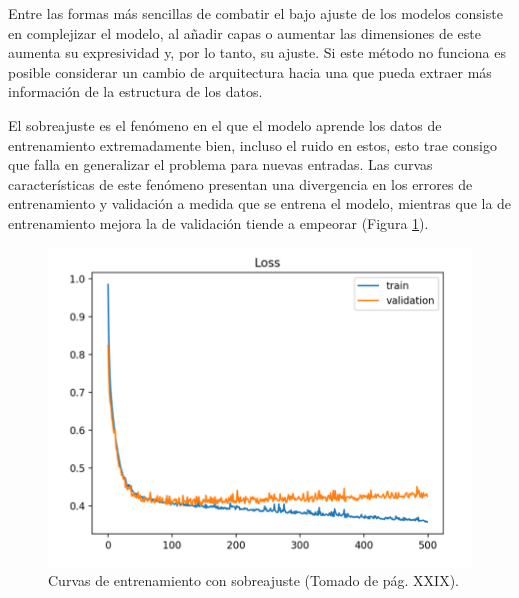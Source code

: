 Entre las formas más sencillas de combatir el bajo ajuste de los modelos consiste en complejizar el modelo, al añadir
capas o aumentar las dimensiones de este aumenta su expresividad y, por lo tanto, su ajuste. Si este método 
no funciona es posible considerar un cambio de arquitectura hacia una que pueda extraer más información de la 
estructura de los datos. 

El sobreajuste es el fenómeno en el que el modelo aprende los datos de entrenamiento extremadamente bien, incluso
el ruido en estos, esto trae consigo que falla en generalizar el problema para nuevas entradas. Las curvas 
características de este fenómeno presentan una divergencia en los errores de entrenamiento y validación a medida
que se entrena el modelo, mientras que la de entrenamiento mejora la de validación tiende a empeorar (Figura \ref{fig:overfit}). 

\begin{figure}[h!]
	\begin{center}
		\begin{center}
			\includegraphics[scale=.3]{Graphics/overfit_raising_val_error.png}
        \end{center}
	    \caption{Curvas de entrenamiento con sobreajuste (Tomado de \textcite{brownlee2018better} pág. XXIX).}\label{fig:overfit}
	\end{center}
\end{figure}

